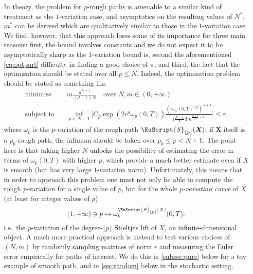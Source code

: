 \documentclass{article}
\def\eps{\varepsilon}
\newcommand{\bX}{\boldsymbol{X}}
\def\Sig{\EuScript{S}}
\def\p{{\lfloor p \rfloor}}
\numberwithin{equation}{section}
\theoremstyle{definition}
\theoremstyle{remark}
\begin{document}
In theory, the problem for $p$-rough paths is amenable to a similar kind of treatment as the $1$-variation case, and asymptotics on the resulting values of $N^*$, $m^*$ can be derived which are qualitatively similar to those in the $1$-variation case. We find, however, that this approach loses some of its importance for three main reasons: first, the bound involves constants and we do not expect it to be asymptotically sharp as the $1$-variation bound is, second the aforementioned \eqref{eq:optpart} difficulty in finding a good choice of $\pi$, and third, the fact that the optimisation should be stated over all $p \leq N$. Indeed, the optimisation problem should be stated as something like
\begin{align*}
	\text{minimise}\quad &m\frac{d^{N+1}}{(d-1)N} \quad \text{over } N, m \in (0,+\infty) \\
\text{subject to}\quad &\inf_{p < N + 1}  \bigg[ C_p \exp(2r^p \omega_p(0,T))  \frac{(r \omega_p(0,T)^{1/p})^{N+1}}{\big(\frac{N+1}{p}\big)! m^{\frac{N+1}{p} - 1} } \bigg] \leq \eps.
\end{align*}
where $\omega_p$ is the $p$-variation of the rough path $\Sig_{\p}(\bX)$; if $\bX$ itself is a $p_0$-rough path, the infimum should be taken over $p_0 \leq p < N + 1$. The point here is that taking higher $N$ unlocks the possibility of estimating the error in terms of $\omega_p(0,T)$ with higher $p$, which provide a much better estimate even if $X$ is smooth (but has very large $1$-variation norm). Unfortunately, this means that in order to approach this problem one must not only be able to compute the rough $p$-variation for a single value of $p$, but for the whole \emph{$p$-variation curve} of $X$ (at least for integer values of $p$)
\begin{equation}
[1,+\infty) \ni p \mapsto \omega_p^{\Sig_\p(X)}(0,T),
\end{equation}
i.e.\ the $p$-variation of the degree-$\p$ Stieltjes lift of $X$, an infinite-dimensional object. A much more practical approach is instead to test various choices of $(N,m)$ by randomly sampling matrices of norm $r$ and measuring the Euler error empirically for paths of interest. We do this in \autoref{subsec:pure} below for a toy example of smooth path, and in \autoref{sec:random} below in the stochastic setting.\\
\end{document}
